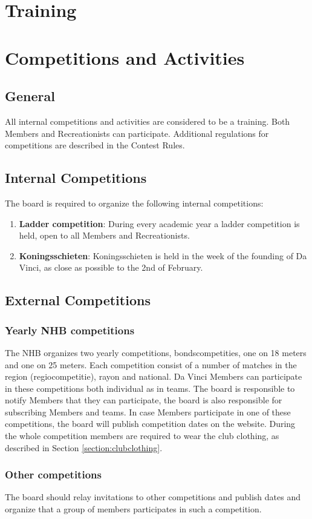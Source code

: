 \documentclass[a4paper]{article}
\newcommand{\Awr}{Contest Rules} %
\begin{document}
\section{Training}

\section{Competitions and Activities}
\subsection{General}
All internal competitions and activities are considered to be a training. Both Members and Recreationists can participate. Additional regulations for competitions are described in the \Awr .

\subsection{Internal Competitions}
The board is required to organize the following internal competitions: \\
\begin{enumerate}
\item \textbf{Ladder competition}: During every academic year a ladder competition is held, open to all Members and Recreationists.
\item \textbf{Koningsschieten}: Koningsschieten is held in the week of the founding of Da Vinci, as close as possible to the 2nd of February.
\end{enumerate}

\subsection{External Competitions}
\subsubsection{Yearly NHB competitions}
The NHB organizes two yearly competitions, bondscompetities, one on 18 meters and one on 25 meters. Each competition consist of a number of matches in the region (regiocompetitie), rayon and national. Da Vinci Members can participate in these competitions both individual as in teams. The board is responsible to notify Members that they can participate, the board is also responsible for subscribing Members and teams. In case Members participate in one of these competitions, the board will publish competition dates on the website. During the whole competition members are required to wear the club clothing, as described in Section \ref{section:clubclothing}.

\subsubsection{Other competitions}
The board should relay invitations to other competitions and publish dates and organize that a group of members participates in such a competition.
\end{document}
